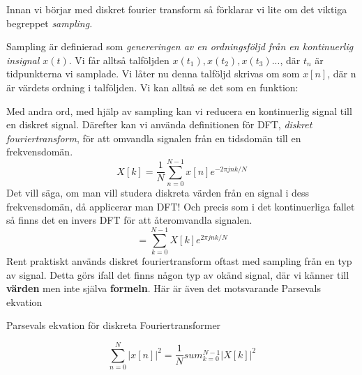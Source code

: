 \documentclass{article}
\begin{document}
Innan vi börjar med diskret fourier transform så förklarar vi lite om
det viktiga begreppet \emph{sampling.}

Sampling är definierad som \emph{genereringen av en ordningsföljd från en
  kontinuerlig insignal $x(t)$}.
Vi får alltså talföljden $x(t_1), x(t_2), x(t_3)... $, där $t_n$ är tidpunkterna
vi samplade. Vi låter nu denna talföljd skrivas om som $x[n]$,
där n är värdets ordning i talföljden. Vi kan alltså se det som en funktion:



Med andra ord, med hjälp av sampling kan vi reducera en kontinuerlig signal
till en diskret signal.
Därefter kan vi använda definitionen för DFT,
\emph{diskret fouriertransform}, för att omvandla signalen från en tidsdomän
till en frekvensdomän.
\begin{displaymath}
  X[k] = \frac{1}{N} \sum_{n=0}^{N-1} x[n] e^{-2 \pi j n k/N}
\end{displaymath}
Det vill säga, om man vill studera diskreta värden från en signal
i dess frekvensdomän, då applicerar man DFT! Och precis som i det kontinuerliga
fallet så finns det en invers DFT för att återomvandla signalen.
\begin{displaymath}
  [n] = \sum_{k=0}^{N-1} X[k] e^{2 \pi j n k/N}
\end{displaymath}
Rent praktiskt används diskret fouriertransform oftast med sampling från en
typ av signal. Detta görs ifall det finns någon typ av okänd signal,
där vi känner till \textbf{värden} men inte själva \textbf{formeln}.
Här är även det motsvarande Parsevals ekvation

Parsevals ekvation för diskreta Fouriertransformer

\begin{displaymath}
  \sum_{n=0}^{N} |x[n]|^2 = \frac{1}{N} sum_{k=0}^{N-1} |X[k]|^2
\end{displaymath}

\end{document}
